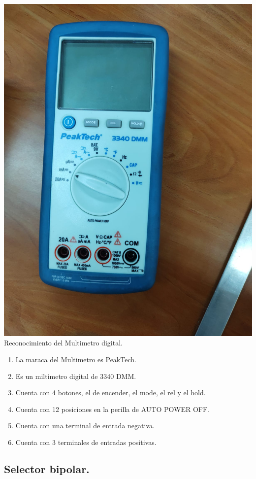\documentclass[10pt]{article}
\begin{document}
\begin{multicols}{2}
\begin{center}
\includegraphics[scale=0.1]{Multimetro}\\
Reconocimiento del Multimetro digital.
\begin{enumerate}
\item La maraca del Multimetro es PeakTech.
\item Es un miltimetro digital de 3340 DMM.
\item Cuenta con 4 botones, el de encender, el mode, el rel y el hold.
\item Cuenta con 12 posiciones en la perilla de AUTO POWER OFF.
\item Cuenta con una terminal de entrada negativa.
\item Cuenta con 3 terminales de entradas positivas.
\end{enumerate}
\end{center}

\subsection{Selector bipolar.}


\end{multicols}
\end{document}
